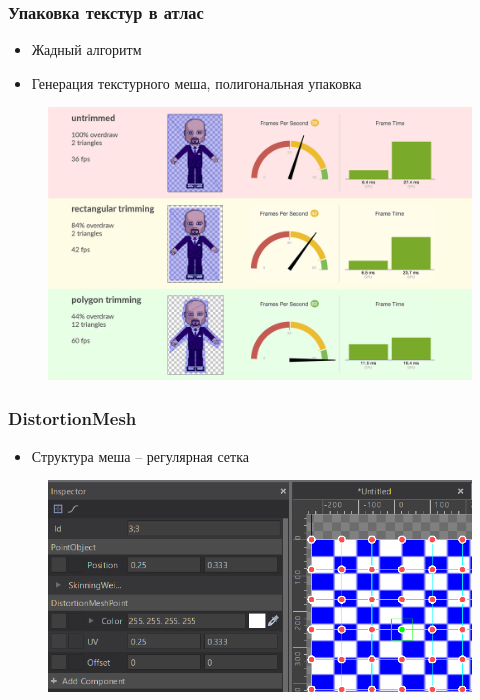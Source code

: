 \documentclass[10pt, unicode]{beamer}
\begin{document}
    \begin{frame}
        \frametitle{Упаковка текстур в атлас}
        \begin{itemize}
            \item Жадный алгоритм
            \item Генерация текстурного меша, полигональная упаковка
        \end{itemize}
        \begin{figure}
            \centering
            \includegraphics[width=\linewidth, keepaspectratio]{SuperPacking.png}
        \end{figure}
    \end{frame}
    \begin{frame}
        \frametitle{DistortionMesh}
        \begin{itemize}
            \item Структура меша -- регулярная сетка
        \end{itemize}
        \begin{figure}
            \centering
            \includegraphics[scale=0.5]{DistortionMesh.png}
        \end{figure}
    \end{frame}
\end{document}
